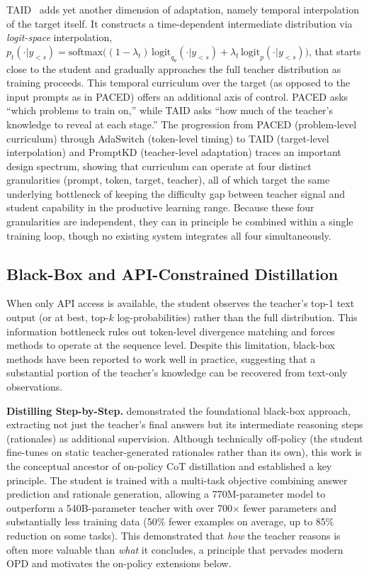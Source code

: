\documentclass{article} %
\begin{document}
TAID~\citep{2501.16937} adds yet another dimension of adaptation, namely temporal interpolation of the target itself. It constructs a time-dependent intermediate distribution via \emph{logit-space} interpolation, $p_t(\cdot|y_{<s}) = \mathrm{softmax}\big((1-\lambda_t)\,\mathrm{logit}_{q_\theta}(\cdot|y_{<s}) + \lambda_t\,\mathrm{logit}_p(\cdot|y_{<s})\big)$, that starts close to the student and gradually approaches the full teacher distribution as training proceeds. This temporal curriculum over the target (as opposed to the input prompts as in PACED) offers an additional axis of control. PACED asks ``which problems to train on,'' while TAID asks ``how much of the teacher's knowledge to reveal at each stage.'' The progression from PACED (problem-level curriculum) through AdaSwitch (token-level timing) to TAID (target-level interpolation) and PromptKD (teacher-level adaptation) traces an important design spectrum, showing that curriculum can operate at four distinct granularities (prompt, token, target, teacher), all of which target the same underlying bottleneck of keeping the difficulty gap between teacher signal and student capability in the productive learning range. Because these four granularities are independent, they can in principle be combined within a single training loop, though no existing system integrates all four simultaneously.

\subsection{Black-Box and API-Constrained Distillation}
\label{subsec:black_box}

When only API access is available, the student observes the teacher's top-1 text output (or at best, top-$k$ log-probabilities) rather than the full distribution. This information bottleneck rules out token-level divergence matching and forces methods to operate at the sequence level. Despite this limitation, black-box methods have been reported to work well in practice, suggesting that a substantial portion of the teacher's knowledge can be recovered from text-only observations.

\textbf{Distilling Step-by-Step.} \citet{2305.02301} demonstrated the foundational black-box approach, extracting not just the teacher's final answers but its intermediate reasoning steps (rationales) as additional supervision. Although technically off-policy (the student fine-tunes on static teacher-generated rationales rather than its own), this work is the conceptual ancestor of on-policy CoT distillation and established a key principle. The student is trained with a multi-task objective combining answer prediction and rationale generation, allowing a 770M-parameter model to outperform a 540B-parameter teacher with over 700$\times$ fewer parameters and substantially less training data (50\% fewer examples on average, up to 85\% reduction on some tasks). This demonstrated that \emph{how} the teacher reasons is often more valuable than \emph{what} it concludes, a principle that pervades modern OPD and motivates the on-policy extensions below.
\end{document}
